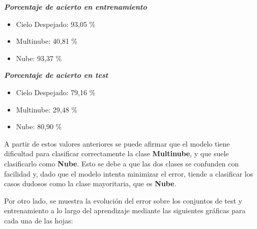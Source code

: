 \documentclass{uc3mpracticas}
\begin{document}
\begin{multicols}{2}

\textbf{\textit{Porcentaje de acierto en entrenamiento}}

\begin{itemize}
  \item Cielo Despejado: 93,05 \%
  \item Multinube: 40,81 \%
  \item Nube: 93,37 \%
\end{itemize}

\columnbreak


\textbf{\textit{Porcentaje de acierto en test}}

\begin{itemize}
  \item Cielo Despejado: 79,16 \%
  \item Multinube: 29,48 \%
  \item Nube: 80,90 \%
\end{itemize}
\end{multicols}

A partir de estos valores anteriores se puede afirmar que el modelo tiene dificultad para clasificar correctamente la clase \textbf{Multinube}, y que suele clasificarlo como \textbf{Nube}. Esto se debe a que las dos clases se confunden con facilidad y, dado que el modelo intenta minimizar el error, tiende a clasificar los casos dudosos como la clase mayoritaria, que es \textbf{Nube}.


\vspace{5mm}

Por otro lado, se muestra la evolución del error sobre los conjuntos de test y entrenamiento a lo largo del aprendizaje mediante las siguientes gráficas para cada una de las hojas:
\end{document}
